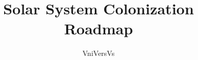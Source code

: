 \documentclass[]{article}
\title{Solar System Colonization Roadmap}
\author{VniVersVs}
\begin{document}
\maketitle

\begin{abstract}

\end{abstract}

\section{}
\end{document}
